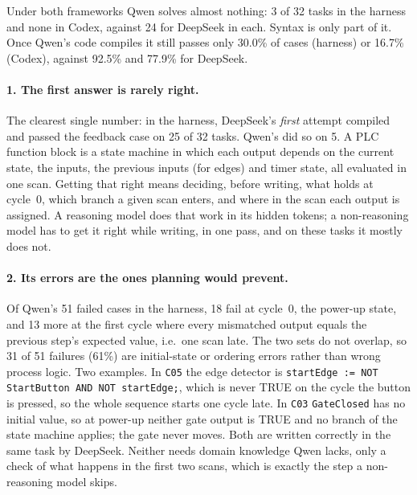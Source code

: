 Under both frameworks Qwen solves almost nothing: 3 of 32 tasks in the harness
and none in Codex, against 24 for DeepSeek in each. Syntax is only part of it.
Once Qwen's code compiles it still passes only 30.0\% of cases (harness) or
16.7\% (Codex), against 92.5\% and 77.9\% for DeepSeek.

\paragraph{1. The first answer is rarely right.}
The clearest single number: in the harness, DeepSeek's \emph{first} attempt
compiled and passed the feedback case on 25 of 32 tasks. Qwen's did so on 5.
A PLC function block is a state machine in which each output depends on the
current state, the inputs, the previous inputs (for edges) and timer state, all
evaluated in one scan. Getting that right means deciding, before writing, what
holds at cycle~0, which branch a given scan enters, and where in the scan each
output is assigned. A reasoning model does that work in its hidden tokens; a
non-reasoning model has to get it right while writing, in one pass, and on these
tasks it mostly does not.

\paragraph{2. Its errors are the ones planning would prevent.}
Of Qwen's 51 failed cases in the harness, 18 fail at cycle~0, the power-up
state, and 13 more at the first cycle where every mismatched output equals the
previous step's expected value, i.e.\ one scan late. The two sets do not
overlap, so 31 of 51 failures (61\%) are initial-state or ordering errors
rather than wrong process logic. Two examples. In \texttt{C05} the edge detector
is \texttt{startEdge := NOT StartButton AND NOT startEdge;}, which is never TRUE
on the cycle the button is pressed, so the whole sequence starts one cycle late.
In \texttt{C03} \texttt{GateClosed} has no initial value, so at power-up neither
gate output is TRUE and no branch of the state machine applies; the gate never
moves. Both are written correctly in the same task by DeepSeek. Neither needs
domain knowledge Qwen lacks, only a check of what happens in the first two
scans, which is exactly the step a non-reasoning model skips.


